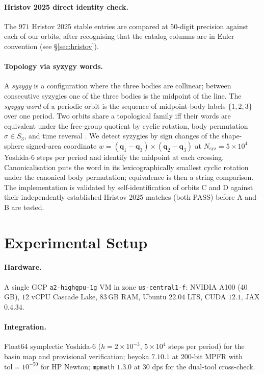 \documentclass[10pt]{article}
\newcommand{\qvec}{\mathbf{q}}
\begin{document}
\paragraph{Hristov 2025 direct identity check.}
The $971$ Hristov 2025 stable entries are compared at $50$-digit
precision against each of our orbits, after recognising that the
catalog columns are in Euler convention (see \S\ref{sec:hristov}).

\paragraph{Topology via syzygy words.}
A \emph{syzygy} is a configuration where the three bodies are
collinear; between consecutive syzygies one of the three bodies is
the midpoint of the line. The \emph{syzygy word} of a periodic orbit
is the sequence of midpoint-body labels $\{1, 2, 3\}$ over one
period. Two orbits share a topological family iff their words are
equivalent under the free-group quotient by cyclic rotation, body
permutation $\sigma \in S_3$, and time reversal
\citep{Moore1993, Montgomery2015}. We detect syzygies by sign changes
of the shape-sphere signed-area coordinate
$w = (\qvec_1 - \qvec_3) \times (\qvec_2 - \qvec_3)$ at
$N_{\mathrm{syz}} = 5\!\times\!10^4$ Yoshida-$6$ steps per period and
identify the midpoint at each crossing. Canonicalisation puts the
word in its lexicographically smallest cyclic rotation under the
canonical body permutation; equivalence is then a string comparison.
The implementation is validated by self-identification of orbits C
and D against their independently established Hristov 2025 matches
(both PASS) before A and B are tested.

\section{Experimental Setup}

\paragraph{Hardware.}
A single GCP \texttt{a2-highgpu-1g} VM in zone \texttt{us-central1-f}:
NVIDIA A100 (40\,GB), $12$ vCPU Cascade Lake, $83$\,GB RAM, Ubuntu
$22.04$ LTS, CUDA $12.1$, JAX $0.4.34$.

\paragraph{Integration.}
Float64 symplectic Yoshida-$6$ ($h = 2 \times 10^{-3}$,
$5 \times 10^{4}$ steps per period) for the basin map and
provisional verification; heyoka $7.10.1$ at $200$-bit MPFR with
$\mathrm{tol} = 10^{-50}$ for HP Newton; \texttt{mpmath} $1.3.0$ at
$30$ dps for the dual-tool cross-check.
\end{document}
